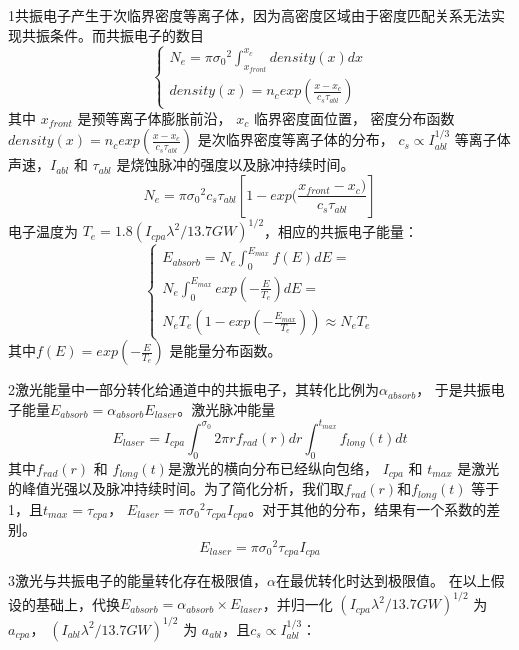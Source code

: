 1共振电子产生于次临界密度等离子体，因为高密度区域由于密度匹配关系无法实现共振条件。而共振电子的数目
\begin{equation}
\label{eqn:DLAnumber}
\begin{cases}
N_e = \pi {{\sigma}_0}^2 {{\int}_{x_{front}}^{x_c}} density(x) dx  \\
density(x)=n_c exp(\frac{x-x_c}{c_s{\tau}_{abl}})
\end{cases}
\end{equation}
其中 $x_{front}$ 是预等离子体膨胀前沿， $x_c$ 临界密度面位置， 密度分布函数 $density(x)=n_c exp(\frac{x-x_c}{c_s{\tau}_{abl}})$ 是次临界密度等离子体的分布， $c_s \propto {I_{abl}^{1/3}}$ 等离子体声速，$I_{abl}$ 和 ${\tau}_{abl}$ 是烧蚀脉冲的强度以及脉冲持续时间。  
\begin{equation}
\label{eqn:DLAnumber1}
N_e = \pi {{\sigma}_0}^2 c_s {\tau}_{abl}[1-exp(\frac{x_{front}-x_c)}{{c_s{\tau}_{abl}}}]
\end{equation}
电子温度为 $T_e = 1.8(I_{cpa} {\lambda}^2/{13.7}GW)^{1/2}$，相应的共振电子能量：
\begin{equation}
\label{eqn:DLAenergy}
\begin{cases}
E_{absorb} = N_e{{\int}_{0}^{E_{max}}} f(E) dE = \\ 
N_e {{\int}_{0}^{E_{max}}} exp(-\frac{E}{T_e}) dE =  \\
N_e T_e (1-exp(-\frac{E_{max}}{T_e})) \approx N_e T_e
\end{cases}
\end{equation}
其中$f(E) = exp(-\frac{E}{T_e})$ 是能量分布函数。

2激光能量中一部分转化给通道中的共振电子，其转化比例为$\alpha_{absorb}$， 于是共振电子能量$E_{absorb} =\alpha_{absorb} E_{laser} $。激光脉冲能量
\begin{equation}
\label{eqn:laserEnergy}
E_{laser}=I_{cpa}{{\int}_{0}^{{\sigma}_0}} 2\pi r f_{rad}(r) dr {{\int}_{0}^{t_{max}}} f_{long}(t) dt
\end{equation}
其中$f_{rad}(r)$ 和 $f_{long}(t)$是激光的横向分布已经纵向包络， $I_{cpa}$ 和 $t_{max}$ 是激光的峰值光强以及脉冲持续时间。为了简化分析，我们取$f_{rad}(r)$和$f_{long}(t)$ 等于1，且$t_{max}=\tau_{cpa}$， $E_{laser}= \pi {{\sigma}_0}^2 \tau_{cpa} I_{cpa}$。对于其他的分布，结果有一个系数的差别。
\begin{equation}
\label{eqn:laserEnergy1}
E_{laser}= \pi {{\sigma}_0}^2 \tau_{cpa} I_{cpa}
\end{equation}


3激光与共振电子的能量转化存在极限值，$\alpha$在最优转化时达到极限值。
在以上假设的基础上，代换$E_{absorb}={\alpha}_{absorb} \times E_{laser}$，并归一化 $(I_{cpa} {\lambda}^2/{13.7}GW)^{1/2}$ 为 $a_{cpa}$， $(I_{abl} {\lambda}^2/{13.7}GW)^{1/2}$ 为 $a_{abl}$，且$c_s \propto {I_{abl}^{1/3}}$：

